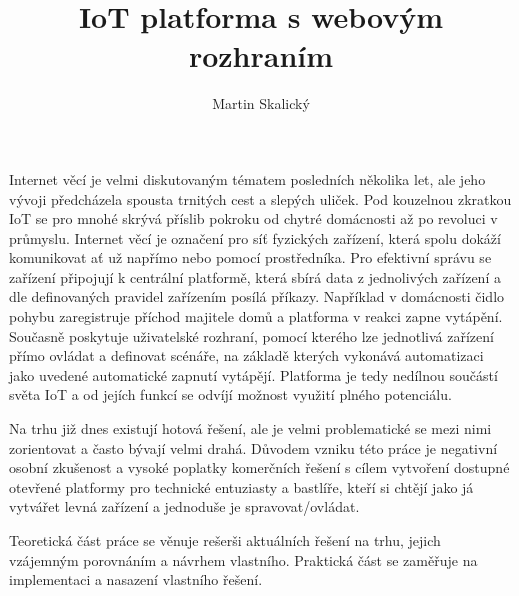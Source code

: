 \documentclass[thesis=B,czech]{FITthesis}[2019/12/23]
\title{IoT platforma s webovým rozhraním}
\author{Martin Skalický} %
\begin{document}

\begin{introduction}

    Internet věcí je velmi diskutovaným tématem posledních několika let, ale jeho vývoji předcházela spousta trnitých cest a slepých uliček. Pod kouzelnou zkratkou IoT se pro mnohé skrývá příslib pokroku od chytré domácnosti až po revoluci v průmyslu. Internet věcí je označení pro síť fyzických zařízení, která spolu dokáží komunikovat ať už napřímo nebo pomocí prostředníka. Pro efektivní správu se zařízení připojují k centrální platformě, která sbírá data z jednolivých zařízení a dle definovaných pravidel zařízením posílá příkazy. Například v domácnosti čidlo pohybu zaregistruje příchod majitele domů a platforma v reakci zapne vytápění. Současně poskytuje uživatelské rozhraní, pomocí kterého lze jednotlivá zařízení přímo ovládat a definovat scénáře, na základě kterých vykonává automatizaci jako uvedené automatické zapnutí vytápějí. Platforma je tedy nedílnou součástí světa IoT a od jejích funkcí se odvíjí možnost využití plného potenciálu.

    Na trhu již dnes existují hotová řešení, ale je velmi problematické se mezi nimi zorientovat a často bývají velmi drahá. Důvodem vzniku této práce je negativní osobní zkušenost a vysoké poplatky komerčních řešení s cílem vytvoření dostupné otevřené platformy pro technické entuziasty a bastlíře, kteří si chtějí jako já vytvářet levná zařízení a jednoduše je spravovat/ovládat.

    Teoretická část práce se věnuje rešerši aktuálních řešení na trhu, jejich vzájemným porovnáním a návrhem vlastního. Praktická část se zaměřuje na implementaci a nasazení vlastního řešení.




\end{introduction}
\end{document}
